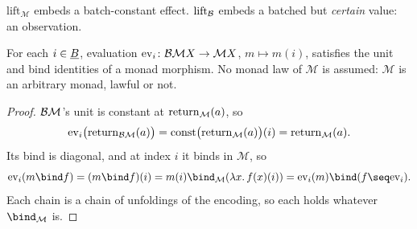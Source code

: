 $\mathrm{lift}_{\mathcal M}$ embeds a batch-constant effect.
$\mathrm{lift}_{\mathcal B}$ embeds a batched but \emph{certain} value: an
observation.

\begin{theorem}
\label{thm:pointwise-eval}
\leanok
For each $i \in \underline B$, evaluation
$\mathrm{ev}_i \colon \mathcal B\mathcal M X \to \mathcal M X$,
$m \mapsto m(i)$, satisfies the unit and bind identities of a monad
morphism. No monad law of $\mathcal M$ is assumed: $\mathcal M$ is an
arbitrary monad, lawful or not.
\end{theorem}

\begin{proof}
\leanok
$\mathcal B\mathcal M$'s unit is constant at $\mathrm{return}_{\mathcal M}(a)$, so
\[
  \mathrm{ev}_i\bigl(\mathrm{return}_{\mathcal B\mathcal M}(a)\bigr)
    = \mathrm{const}\bigl(\mathrm{return}_{\mathcal M}(a)\bigr)(i)
    = \mathrm{return}_{\mathcal M}(a).
\]
Its bind is diagonal, and at index $i$ it binds in $\mathcal M$, so
\[
  \mathrm{ev}_i(m \bind f) = (m \bind f)(i)
    = m(i) \bind_{\mathcal M} (\lambda x.\, f(x)(i))
    = \mathrm{ev}_i(m) \bind (f \seq \mathrm{ev}_i).
\]
Each chain is a chain of unfoldings of the encoding, so each holds
whatever $\bind_{\mathcal M}$ is.
\end{proof}

